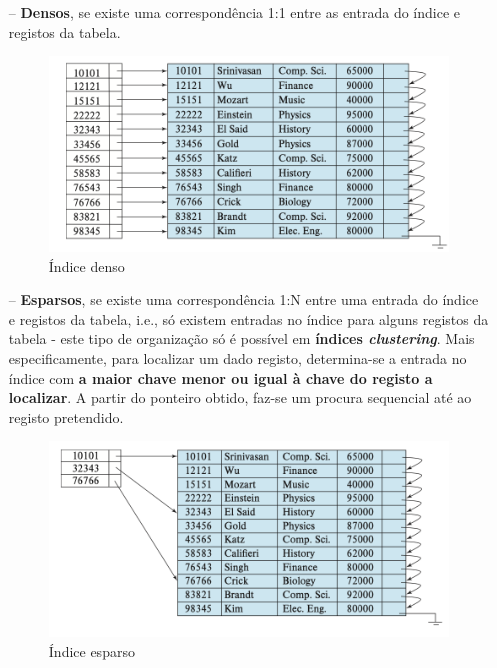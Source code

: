 \documentclass[oneside]{book}
\theoremstyle{definition}
\begin{document}
\begin{itemize}
    \item[--] \textbf{Densos}, se existe uma correspondência 1:1 entre as entrada do índice e registos da tabela.
    \begin{figure}[H]
        \centering
        \includegraphics[scale = 0.60]{cap_indices/indice_denso.png}
        \caption{Índice denso}
    \end{figure}
    \item[--] \textbf{Esparsos}, se existe uma correspondência 1:N entre uma entrada do índice e registos da tabela, i.e., só existem entradas no índice para alguns registos da tabela - este tipo de organização só é possível em \textbf{índices \textit{clustering}}. Mais especificamente, para localizar um dado registo, determina-se a entrada no índice com \textbf{a maior chave menor ou igual à chave do registo a localizar}. A partir do ponteiro obtido, faz-se um procura sequencial até ao registo pretendido.
    \begin{figure}[H]
        \centering
        \includegraphics[scale = 0.60]{cap_indices/indice_esparso.png}
        \caption{Índice esparso}
    \end{figure}
\end{itemize}
\end{document}
